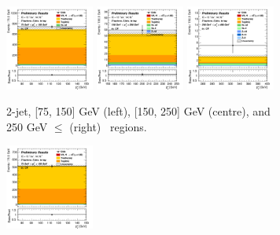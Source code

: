 \begin{figure}[h!]
    \centering
    \begin{subfigure}[b]{\textwidth}
        \centering
        \includegraphics[width=0.32\textwidth]{Images/VH/Own_fit/prefit_VHcc/Region_distpTV_BMax150_BMin75_Dtopemucr_J2_TTypeta_T2_L2_Y6051_Prefit.png}
        \includegraphics[width=0.32\textwidth]{Images/VH/Own_fit/prefit_VHcc/Region_distpTV_BMax250_BMin150_Dtopemucr_J2_TTypeta_T2_L2_Y6051_Prefit.png}
        \includegraphics[width=0.32\textwidth]{Images/VH/Own_fit/prefit_VHcc/Region_distpTV_BMax400_BMin250_Dtopemucr_J2_TTypeta_T2_L2_Y6051_Prefit.png}
        \caption{2-jet, [75, 150] GeV (left), [150, 250] GeV (centre), and 250  GeV $\leq$ (right) \ptv\ regions.}
        \label{fig:plots_VHcc_2L_topCRemu_2J}
    \end{subfigure}
    \begin{subfigure}[b]{\textwidth}
        \centering
        \includegraphics[width=0.32\textwidth]{Images/VH/Own_fit/prefit_VHcc/Region_distpTV_BMax150_BMin75_Dtopemucr_J3_TTypeta_T2_L2_Y6051_Prefit.png}

\end{subfigure}
\end{figure}

